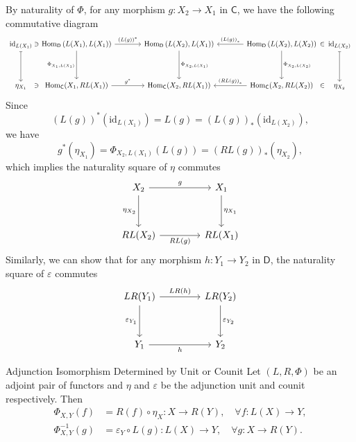 \begin{prf}
    By naturality of $\Phi$, for any morphism $g:X_2\to X_1$ in $\mathsf{C}$, we have the following commutative diagram
    \[
    \begin{tikzcd}[ampersand replacement=\&]
        \mathrm{id}_{L(X_1)}\arrow[d,mapsto]\&[-30pt]\ni\&[-29pt]{\operatorname{Hom}_{\mathsf{D}}\left(L(X_1), L(X_1)\right) } \arrow[d, "{\Phi_{X_1,L(X_1)}}"'] \arrow[r,"{\left(L(g)\right)^*}"] \& [+12pt]{\operatorname{Hom}_{\mathsf{D}}\left(L(X_2), L(X_1)\right) } \arrow[d, "{\Phi_{X_2,L(X_1)}}"] \&[+12pt] {\operatorname{Hom}_{\mathsf{D}}\left(L(X_2), L(X_2)\right) } \arrow[d, "{\Phi_{X_2,L(X_2)}}"] \arrow[l,"{\left(L(g)\right)_*}"'] \&[-28pt]\in\&[-28pt]\mathrm{id}_{L(X_2)}\arrow[d,mapsto]\\[+20pt]
        \eta_{X_1}\&\ni\&{\operatorname{Hom}_{\mathsf{C}}(X_1, RL(X_1))} \arrow[r,"g^*"]                                                    \& {\operatorname{Hom}_{\mathsf{C}}(X_2, RL(X_1))}                                                   \& {\operatorname{Hom}_{\mathsf{C}}(X_2, RL(X_2))} \arrow[l, "\left(RL(g)\right)_*"']            \&[-30pt]\in\&[-30pt]\eta_{X_2}       
        \end{tikzcd}
        \]
        Since
        \[
        (L(g))^*\left(\mathrm{id}_{L(X_1)}\right)=L(g)=(L(g))_*\left(\mathrm{id}_{L(X_2)}\right),
        \]
        we have
        \[
        g^*(\eta_{X_1})=\Phi_{X_2,L(X_1)}(L(g))=\left(RL(g)\right)_*(\eta_{X_2}),
        \]   
    which implies the naturality square of $\eta$ commutes
\[
    \begin{tikzcd}[ampersand replacement=\&]
        X_2 \arrow[d, "{\eta_{X_2}}"'] \arrow[r, "g"] \&[+18pt]X_1\arrow[d, "{\eta_{X_1}}"]    \\[+15pt]
         RL(X_2)\arrow[r, "RL(g)"']\& RL(X_1)
    \end{tikzcd}
\] 
Similarly, we can show that for any morphism $h:Y_1\to Y_2$ in $\mathsf{D}$, the naturality square of $\varepsilon$ commutes
\[
    \begin{tikzcd}[ampersand replacement=\&]
        LR(Y_1) \arrow[d, "{\varepsilon_{Y_1}}"'] \arrow[r, "LR(h)"] \&[+18pt]LR(Y_2)\arrow[d, "{\varepsilon_{Y_2}}"]    \\[+15pt]
         Y_1\arrow[r, "h"']\& Y_2
    \end{tikzcd}
\]
\end{prf}

\begin{proposition}{Adjunction Isomorphism Determined by Unit or Counit}{}
    Let $\left(L,R,\Phi\right)$ be an adjoint pair of functors and $\eta$ and $\varepsilon$ be the adjunction unit and counit respectively. Then 
   \begin{align*}
\Phi_{X,Y}(f) & =R(f) \circ \eta_X: X \rightarrow R(Y), \quad \forall f: L(X) \rightarrow Y , \\
\Phi_{X,Y}^{-1}(g) & =\varepsilon_Y \circ L(g): L(X) \rightarrow Y, \quad \forall g: X \rightarrow R(Y) .
   \end{align*}
\end{proposition}

